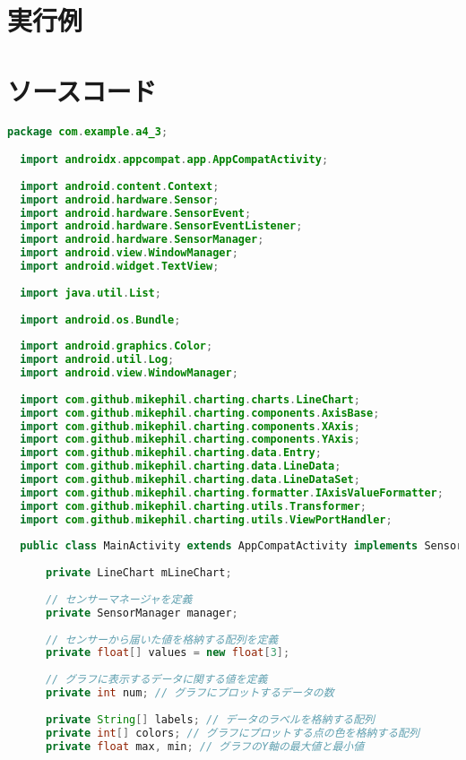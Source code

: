 \documentclass[dvipdfmx,autodetect-engine,titlepage]{jsarticle}
\begin{document}
\section{実行例}


\section{ソースコード}

\lstset{
    frame=single,
    numbers=left,
    tabsize=2
}

\begin{lstlisting}[language=java]
  package com.example.a4_3;

  import androidx.appcompat.app.AppCompatActivity;
  
  import android.content.Context;
  import android.hardware.Sensor;
  import android.hardware.SensorEvent;
  import android.hardware.SensorEventListener;
  import android.hardware.SensorManager;
  import android.view.WindowManager;
  import android.widget.TextView;
  
  import java.util.List;
  
  import android.os.Bundle;
  
  import android.graphics.Color;
  import android.util.Log;
  import android.view.WindowManager;
  
  import com.github.mikephil.charting.charts.LineChart;
  import com.github.mikephil.charting.components.AxisBase;
  import com.github.mikephil.charting.components.XAxis;
  import com.github.mikephil.charting.components.YAxis;
  import com.github.mikephil.charting.data.Entry;
  import com.github.mikephil.charting.data.LineData;
  import com.github.mikephil.charting.data.LineDataSet;
  import com.github.mikephil.charting.formatter.IAxisValueFormatter;
  import com.github.mikephil.charting.utils.Transformer;
  import com.github.mikephil.charting.utils.ViewPortHandler;
  
  public class MainActivity extends AppCompatActivity implements SensorEventListener {
  
      private LineChart mLineChart;
  
      // センサーマネージャを定義
      private SensorManager manager;
  
      // センサーから届いた値を格納する配列を定義
      private float[] values = new float[3];
  
      // グラフに表示するデータに関する値を定義
      private int num; // グラフにプロットするデータの数
  
      private String[] labels; // データのラベルを格納する配列
      private int[] colors; // グラフにプロットする点の色を格納する配列
      private float max, min; // グラフのY軸の最大値と最小値
  

\end{lstlisting}
\end{document}
